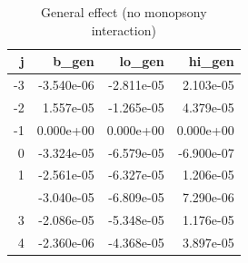 \begin{table}

\caption{General effect (no monopsony interaction)}
\centering
\begin{tabular}[t]{rrrr}
\toprule
j & b\_gen & lo\_gen & hi\_gen\\
\midrule
-3 & -3.540e-06 & -2.811e-05 & 2.103e-05\\
-2 & 1.557e-05 & -1.265e-05 & 4.379e-05\\
-1 & 0.000e+00 & 0.000e+00 & 0.000e+00\\
0 & -3.324e-05 & -6.579e-05 & -6.900e-07\\
1 & -2.561e-05 & -6.327e-05 & 1.206e-05\\
\addlinespace
2 & -3.040e-05 & -6.809e-05 & 7.290e-06\\
3 & -2.086e-05 & -5.348e-05 & 1.176e-05\\
4 & -2.360e-06 & -4.368e-05 & 3.897e-05\\
\bottomrule
\end{tabular}
\end{table}
